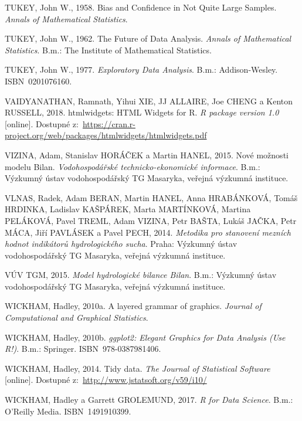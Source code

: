 \documentclass[12pt,]{article}
\begin{document}
\hypertarget{ref-jackknife_tukey}{}
TUKEY, John W., 1958. Bias and Confidence in Not Quite Large Samples.
\emph{Annals of Mathematical Statistics}.

\hypertarget{ref-tukey1962}{}
TUKEY, John W., 1962. The Future of Data Analysis. \emph{Annals of
Mathematical Statistics}. B.m.: The Institute of Mathematical
Statistics.

\hypertarget{ref-tukey1977}{}
TUKEY, John W., 1977. \emph{Exploratory Data Analysis}. B.m.:
Addison-Wesley. ISBN~0201076160.

\hypertarget{ref-htmlwidgets}{}
VAIDYANATHAN, Ramnath, Yihui XIE, JJ ALLAIRE, Joe CHENG a Kenton
RUSSELL, 2018. htmlwidgets: HTML Widgets for R. \emph{R package version
1.0} {[}online{]}. Dostupné
z:~\url{https://cran.r-project.org/web/packages/htmlwidgets/htmlwidgets.pdf}

\hypertarget{ref-bilan}{}
VIZINA, Adam, Stanislav HORÁČEK a Martin HANEL, 2015. Nové možnosti
modelu Bilan. \emph{Vodohospodářské technicko-ekonomické informace}.
B.m.: Výzkumný ústav vodohospodářský TG Masaryka, veřejná výzkumná
instituce.

\hypertarget{ref-sucho}{}
VLNAS, Radek, Adam BERAN, Martin HANEL, Anna HRABÁNKOVÁ, Tomáš HRDINKA,
Ladislav KAŠPÁREK, Marta MARTÍNKOVÁ, Martina PELÁKOVÁ, Pavel TREML, Adam
VIZINA, Petr BAŠTA, Lukáš JAČKA, Petr MÁCA, Jiří PAVLÁSEK a Pavel PECH,
2014. \emph{Metodika pro stanovení mezních hodnot indikátorů
hydrologického sucha}. Praha: Výzkumný ústav vodohospodářský TG
Masaryka, veřejná výzkumná instituce.

\hypertarget{ref-bilan_man}{}
VÚV TGM, 2015. \emph{Model hydrologické bilance Bilan}. B.m.: Výzkumný
ústav vodohospodářský TG Masaryka, veřejná výzkumná instituce.

\hypertarget{ref-layered-grammar}{}
WICKHAM, Hadley, 2010a. A layered grammar of graphics. \emph{Journal of
Computational and Graphical Statistics}.

\hypertarget{ref-wickham_ggplot}{}
WICKHAM, Hadley, 2010b. \emph{ggplot2: Elegant Graphics for Data
Analysis (Use R!)}. B.m.: Springer. ISBN~978-0387981406.

\hypertarget{ref-tidydata}{}
WICKHAM, Hadley, 2014. Tidy data. \emph{The Journal of Statistical
Software} {[}online{]}. Dostupné
z:~\url{http://www.jstatsoft.org/v59/i10/}

\hypertarget{ref-grolemund_wickham2017}{}
WICKHAM, Hadley a Garrett GROLEMUND, 2017. \emph{R for Data Science}.
B.m.: O'Reilly Media. ISBN~1491910399.
\end{document}
